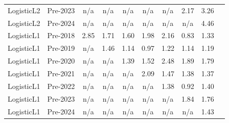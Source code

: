 \begin{table}[H]
{\begin{tabular}{ll cccccccc}
LogisticL2 & Pre-2023 & n/a & n/a & n/a & n/a & n/a & 2.17 & 3.26 \\
LogisticL2 & Pre-2024 & n/a & n/a & n/a & n/a & n/a & n/a & 4.46 \\
\midrule
LogisticL1 & Pre-2018 & 2.85 & 1.71 & 1.60 & 1.98 & 2.16 & 0.83 & 1.33 \\
LogisticL1 & Pre-2019 & n/a & 1.46 & 1.14 & 0.97 & 1.22 & 1.14 & 1.19 \\
LogisticL1 & Pre-2020 & n/a & n/a & 1.39 & 1.52 & 2.48 & 1.89 & 1.79 \\
LogisticL1 & Pre-2021 & n/a & n/a & n/a & 2.09 & 1.47 & 1.38 & 1.37 \\
LogisticL1 & Pre-2022 & n/a & n/a & n/a & n/a & 1.38 & 0.92 & 1.40 \\
LogisticL1 & Pre-2023 & n/a & n/a & n/a & n/a & n/a & 1.84 & 1.76 \\
LogisticL1 & Pre-2024 & n/a & n/a & n/a & n/a & n/a & n/a & 1.43 \\
\bottomrule
\end{tabular}%
}
\end{table}
